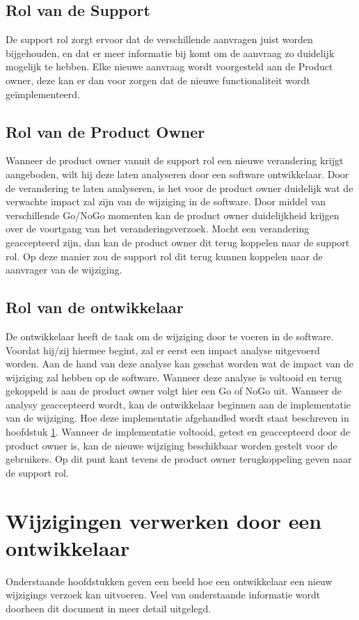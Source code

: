 \subsection{Rol van de Support}
De support rol zorgt ervoor dat de verschillende aanvragen juist worden bijgehouden, en dat er meer informatie bij komt om de aanvraag zo duidelijk mogelijk te hebben. Elke nieuwe aanvraag wordt voorgesteld aan de Product owner, deze kan er dan voor zorgen dat de nieuwe functionaliteit wordt geïmplementeerd.

\subsection{Rol van de Product Owner}
Wanneer de product owner vanuit de support rol een nieuwe verandering krijgt aangeboden, wilt hij deze laten analyseren door een software ontwikkelaar. Door de verandering te laten analyseren, is het voor de product owner duidelijk wat de verwachte impact zal zijn van de wijziging in de software. Door middel van verschillende Go/NoGo momenten kan de product owner duidelijkheid krijgen over de voortgang van het veranderingsverzoek.
Mocht een verandering geaccepteerd zijn, dan kan de product owner dit terug koppelen naar de support rol. Op deze manier zou de support rol dit terug kunnen koppelen naar de aanvrager van de wijziging.

\subsection{Rol van de ontwikkelaar}
De ontwikkelaar heeft de taak om de wijziging door te voeren in de software. Voordat hij/zij hiermee begint, zal er eerst een impact analyse uitgevoerd worden. Aan de hand van deze analyse kan geschat worden wat de impact van de wijziging zal hebben op de software.
Wanneer deze analyse is voltooid en terug gekoppeld is aan de product owner volgt hier een Go of NoGo uit. Wanneer de analysy geaccepteerd wordt, kan de ontwikkelaar beginnen aan de implementatie van de wijziging.
Hoe deze implementatie afgehandled wordt staat beschreven in hoofdstuk \ref{hfd:wd}. Wanneer de implementatie voltooid, getest en geaccepteerd door de product owner is, kan de nieuwe wijziging beschikbaar worden gestelt voor de gebruikers. Op dit punt kant tevens de product owner terugkoppeling geven naar de support rol.
\newpage
\section{Wijzigingen verwerken door een ontwikkelaar} \label{hfd:wd}
Onderstaande hoofdstukken geven een beeld hoe een ontwikkelaar een nieuw wijzigings verzoek kan uitvoeren.
Veel van onderstaande informatie wordt doorheen dit document in meer detail uitgelegd. 
